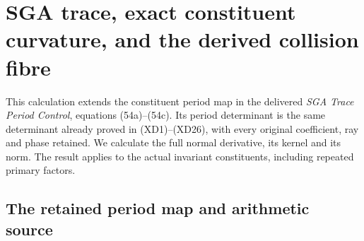 \documentclass{article}
\begin{document}
\maketitle
\section{SGA trace, exact constituent curvature, and the derived collision fibre}
\label{sec:sga-constituent-period-curvature}

This calculation extends the constituent period map in the delivered
\emph{SGA Trace Period Control}, equations (54a)--(54c).  Its period
determinant is the same determinant already proved in (XD1)--(XD26),
with every original coefficient, ray and phase retained.  We calculate
the full normal derivative, its kernel and its norm.  The result applies
to the actual invariant constituents, including repeated primary factors.

\subsection{The retained period map and arithmetic source}
\end{document}

